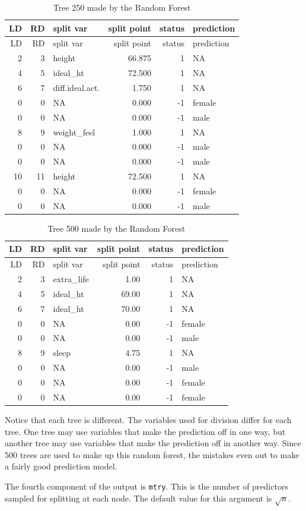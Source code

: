 \documentclass[12pt,twoside]{reedthesis}
\begin{document}
  \begin{longtable}[c]{@{}rrlrrl@{}}
  \caption{Tree 250 made by the Random Forest}\tabularnewline
  \toprule
  LD & RD & split var & split point & status & prediction\tabularnewline
  \midrule
  \endfirsthead
  \toprule
  LD & RD & split var & split point & status & prediction\tabularnewline
  \midrule
  \endhead
  2 & 3 & height & 66.875 & 1 & NA\tabularnewline
  4 & 5 & ideal\_ht & 72.500 & 1 & NA\tabularnewline
  6 & 7 & diff.ideal.act. & 1.750 & 1 & NA\tabularnewline
  0 & 0 & NA & 0.000 & -1 & female\tabularnewline
  0 & 0 & NA & 0.000 & -1 & male\tabularnewline
  8 & 9 & weight\_feel & 1.000 & 1 & NA\tabularnewline
  0 & 0 & NA & 0.000 & -1 & male\tabularnewline
  0 & 0 & NA & 0.000 & -1 & male\tabularnewline
  10 & 11 & height & 72.500 & 1 & NA\tabularnewline
  0 & 0 & NA & 0.000 & -1 & female\tabularnewline
  0 & 0 & NA & 0.000 & -1 & male\tabularnewline
  \bottomrule
  \end{longtable}
  
  \newpage
  
  \begin{longtable}[c]{@{}rrlrrl@{}}
  \caption{Tree 500 made by the Random Forest}\tabularnewline
  \toprule
  LD & RD & split var & split point & status & prediction\tabularnewline
  \midrule
  \endfirsthead
  \toprule
  LD & RD & split var & split point & status & prediction\tabularnewline
  \midrule
  \endhead
  2 & 3 & extra\_life & 1.00 & 1 & NA\tabularnewline
  4 & 5 & ideal\_ht & 69.00 & 1 & NA\tabularnewline
  6 & 7 & ideal\_ht & 70.00 & 1 & NA\tabularnewline
  0 & 0 & NA & 0.00 & -1 & female\tabularnewline
  0 & 0 & NA & 0.00 & -1 & male\tabularnewline
  8 & 9 & sleep & 4.75 & 1 & NA\tabularnewline
  0 & 0 & NA & 0.00 & -1 & male\tabularnewline
  0 & 0 & NA & 0.00 & -1 & female\tabularnewline
  0 & 0 & NA & 0.00 & -1 & female\tabularnewline
  \bottomrule
  \end{longtable}
  
  Notice that each tree is different. The variables used for division
  differ for each tree. One tree may use variables that make the
  prediction off in one way, but another tree may use variables that make
  the prediction off in another way. Since 500 trees are used to make up
  this random forest, the mistakes even out to make a fairly good
  prediction model.
  
  The fourth component of the output is \texttt{mtry}. This is the number
  of predictors sampled for splitting at each node. The default value for
  this argument is \(\sqrt{n}\).
  
\end{document}
